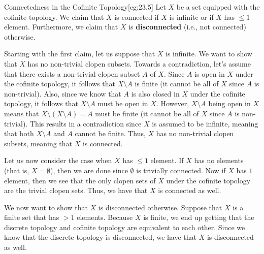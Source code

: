 \begin{egBox}{Connectedness in the Cofinite Topology}[eg:23.5]
    Let \( X \) be a set equipped with the cofinite topology.
    We claim that \( X \) is connected if \( X \) is infinite or if \( X \) 
    has \( \leq 1 \) element.
    Furthermore, we claim that \( X \) is \textbf{disconnected} (i.e., not 
    connected) otherwise.

    \baseSkip

    Starting with the first claim, let us suppose that \( X \) is infinite.
    We want to show that \( X \) has no non-trivial clopen subsets.
    Towards a contradiction, let's assume that there exists a non-trivial 
    clopen subset \( A \) of \( X \).
    Since \( A \) is open in \( X \) under the cofinite topology, it follows
    that \( X \setminus A \) is finite (it cannot be all of \( X \) since 
    \( A \) is non-trivial).
    Also, since we know that \( A \) is also closed in \( X \) under the 
    cofinite topology, it follows that \( X \setminus A \) must be open in 
    \( X \).
    However, \( X \setminus A \) being open in \( X \) means that 
    \( X \setminus ( X \setminus A ) = A \) must be finite (it cannot be all of 
    \( X \) since \( A \) is non-trivial).
    This results in a contradiction since \( X \) is assumed to be infinite,
    meaning that both \( X \setminus A \) and \( A \) cannot be finite.
    Thus, \( X \) has no non-trivial clopen subsets, meaning that \( X \) is 
    connected.

    \baseSkip

    Let us now consider the case when \( X \) has \( \leq 1 \) element.
    If \( X \) has no elements (that is, \( X = \emptyset \)), then we are 
    done since \( \emptyset \) is trivially connected.
    Now if \( X \) has \( 1 \) element, then we see that the only clopen sets of
    \( X \) under the cofinite topology are the trivial clopen sets.
    Thus, we have that \( X \) is connected as well.

    \baseSkip

    We now want to show that \( X \) is disconnected otherwise.
    Suppose that \( X \) is a finite set that has \( > 1 \) elements.
    Because \( X \) is finite, we end up getting that the discrete topology and
    cofinite topology are equivalent to each other.
    Since we know that the discrete topology is disconnected, we have that
    \( X \) is disconnected as well.
\end{egBox}

